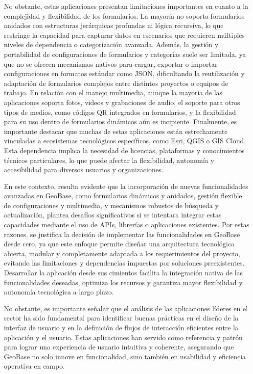 \documentclass[12pt, a4paper]{book}
\begin{document}
No obstante, estas aplicaciones presentan limitaciones importantes en cuanto a la complejidad y flexibilidad de los formularios. La mayoría no soporta formularios anidados con estructuras jerárquicas profundas ni lógica recursiva, lo que restringe la capacidad para capturar datos en escenarios que requieren múltiples niveles de dependencia o categorización avanzada. Además, la gestión y portabilidad de configuraciones de formularios y categorías suele ser limitada, ya que no se ofrecen mecanismos nativos para cargar, exportar o importar configuraciones en formatos estándar como JSON, dificultando la reutilización y adaptación de formularios complejos entre distintos proyectos o equipos de trabajo. En relación con el manejo multimedia, aunque la mayoría de las aplicaciones soporta fotos, videos y grabaciones de audio, el soporte para otros tipos de medios, como códigos QR integrados en formularios, y la flexibilidad para su uso dentro de formularios dinámicos aún es incipiente. Finalmente, es importante destacar que muchas de estas aplicaciones están estrechamente vinculadas a ecosistemas tecnológicos específicos, como Esri, QGIS o GIS Cloud. Esta dependencia implica la necesidad de licencias, plataformas y conocimientos técnicos particulares, lo que puede afectar la flexibilidad, autonomía y accesibilidad para diversos usuarios y organizaciones.

En este contexto, resulta evidente que la incorporación de nuevas funcionalidades avanzadas en GeoBase, como formularios dinámicos y anidados, gestión flexible de configuraciones y multimedia, y mecanismos robustos de búsqueda y actualización, plantea desafíos significativos si se intentara integrar estas capacidades mediante el uso de APIs, librerías o aplicaciones existentes. Por estas razones, se justifica la decisión de implementar las funcionalidades en GeoBase desde cero, ya que este enfoque permite diseñar una arquitectura tecnológica abierta, modular y completamente adaptada a los requerimientos del proyecto, evitando las limitaciones y dependencias impuestas por soluciones preexistentes. Desarrollar la aplicación desde sus cimientos facilita la integración nativa de las funcionalidades deseadas, optimiza los recursos y garantiza mayor flexibilidad y autonomía tecnológica a largo plazo.

No obstante, es importante señalar que el análisis de las aplicaciones líderes en el sector ha sido fundamental para identificar buenas prácticas en el diseño de la interfaz de usuario y en la definición de flujos de interacción eficientes entre la aplicación y el usuario. Estas aplicaciones han servido como referencia y patrón para lograr una experiencia de usuario intuitiva y coherente, asegurando que GeoBase no solo innove en funcionalidad, sino también en usabilidad y eficiencia operativa en campo.
\end{document}
